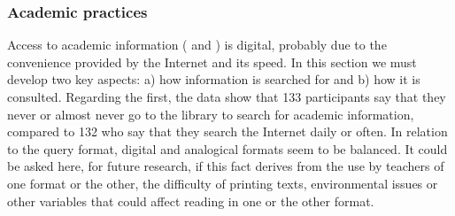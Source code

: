 \documentclass[english]{textolivre}
\begin{document}
\begin{table}[h!]
\centering
\caption{Frequency of consumption in analog format}
\label{tab03}
\end{table}

\subsubsection{Academic practices}
Access to academic information ( and ) is digital, probably due to the convenience provided by the Internet and its speed. In this section we must develop two key aspects: a) how information is searched for and b) how it is consulted. Regarding the first, the data show that 133 participants say that they never or almost never go to the library to search for academic information, compared to 132 who say that they search the Internet daily or often. In relation to the query format, digital and analogical formats seem to be balanced. It could be asked here, for future research, if this fact derives from the use by teachers of one format or the other, the difficulty of printing texts, environmental issues or other variables that could affect reading in one or the other format. 
\end{document}
